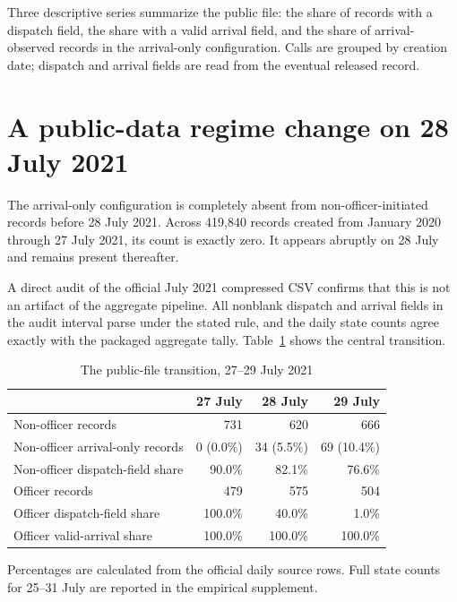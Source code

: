 \documentclass[11pt]{article}
\begin{document}
Three descriptive series summarize the public file: the share of records with a dispatch field, the share with a valid arrival field, and the share of arrival-observed records in the arrival-only configuration. Calls are grouped by creation date; dispatch and arrival fields are read from the eventual released record.

\section{A public-data regime change on 28 July 2021}

The arrival-only configuration is completely absent from non-officer-initiated records before 28 July 2021. Across 419,840 records created from January 2020 through 27 July 2021, its count is exactly zero. It appears abruptly on 28 July and remains present thereafter.

A direct audit of the official July 2021 compressed CSV confirms that this is not an artifact of the aggregate pipeline. All nonblank dispatch and arrival fields in the audit interval parse under the stated rule, and the daily state counts agree exactly with the packaged aggregate tally. Table~\ref{tab:julybreak} shows the central transition.

\begin{table}[!htbp]
\centering
\caption{The public-file transition, 27--29 July 2021}
\label{tab:julybreak}
\begin{tabular}{@{}lrrr@{}}
\toprule
 & 27 July & 28 July & 29 July \\
\midrule
Non-officer records & 731 & 620 & 666 \\
Non-officer arrival-only records & 0 (0.0\%) & 34 (5.5\%) & 69 (10.4\%) \\
Non-officer dispatch-field share & 90.0\% & 82.1\% & 76.6\% \\
Officer records & 479 & 575 & 504 \\
Officer dispatch-field share & 100.0\% & 40.0\% & 1.0\% \\
Officer valid-arrival share & 100.0\% & 100.0\% & 100.0\% \\
\bottomrule
\end{tabular}
\begin{minipage}{0.96\textwidth}\footnotesize
Percentages are calculated from the official daily source rows. Full state counts for 25--31 July are reported in the empirical supplement.
\end{minipage}
\end{table}
\end{document}

